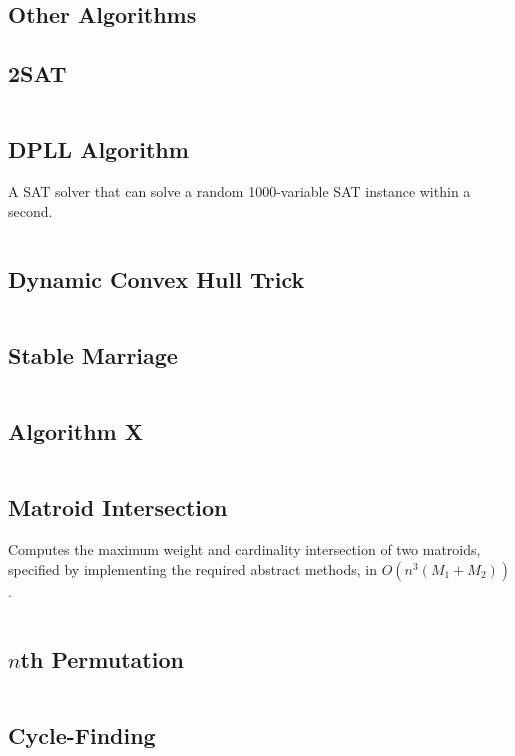 \documentclass[8pt,a4paper,landscape,oneside]{amsart}
\newcommand{\code}[1]{\inputminted[fontsize=\normalsize,baselinestretch=1]{cpp}{_code/#1}}
\newif\ifverbose
\begin{document}
\begin{multicols*}{3}
\section{Other Algorithms}
  \subsection{2SAT}
    \ifverbose
    A fast 2SAT solver.
    \fi
    \code{other/two_sat.cpp}
  \subsection{DPLL Algorithm}
    A SAT solver that can solve a random 1000-variable SAT instance within a second.
    \code{other/dpll.cpp}
  \subsection{Dynamic Convex Hull Trick}
    \code{other/dynamic-ch-trick.cpp}
  \subsection{Stable Marriage}
    \ifverbose
    The Gale-Shapley algorithm for solving the stable marriage problem.
    \fi
    \code{other/stable_marriage.cpp}
  \subsection{Algorithm X}
    \ifverbose
    An implementation of Knuth's Algorithm X, using dancing links. Solves the Exact Cover problem.
    \fi
    \code{other/algorithm_x.cpp}
  \subsection{Matroid Intersection}
    Computes the maximum weight and cardinality intersection of two
    matroids, specified by implementing the required abstract methods, in
    $O(n^3(M_1+M_2))$.
    \code{other/matroid_intersection.cpp}
  \subsection{$n$th Permutation}
    \ifverbose
    A very fast algorithm for computing the $n$th permutation of the list
    $\{0,1,\ldots,k-1\}$.
    \fi
    \code{other/nth_permutation.cpp}
  \subsection{Cycle-Finding}
    \ifverbose
    An implementation of Floyd's Cycle-Finding algorithm.
    \fi
    \code{other/floyds_algorithm.cpp}

\end{multicols*}
\end{document}
